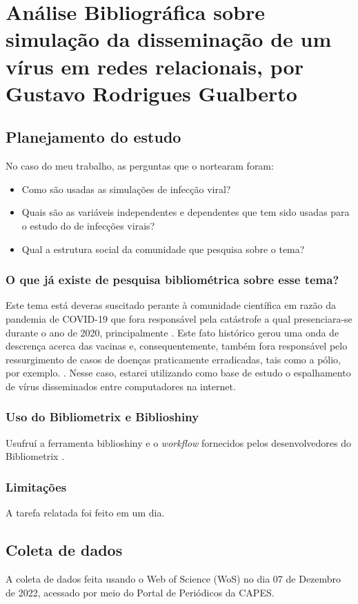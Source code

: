 \chapter{Análise Bibliográfica sobre simulação da disseminação de um vírus em redes relacionais, por Gustavo Rodrigues Gualberto\label{chap:bibliometria:gustavorgygo}}

\section{Planejamento do estudo\label{gustavorgygo:questoes}}

No caso do meu trabalho, as perguntas que o nortearam foram:

\begin{itemize}

    \item Como são usadas as simulações de infecção viral? 
    
    \item Quais são as variáveis independentes e dependentes que tem sido usadas para o estudo do de infecções virais? 
    
    \item Qual a estrutura social da comunidade que pesquisa sobre o tema?
    
\end{itemize}

\subsection{O que já existe de pesquisa bibliométrica sobre esse tema?}

 Este tema está deveras suscitado perante à comunidade científica em razão da pandemia de COVID-19 que fora responsável pela catástrofe a qual presenciara-se durante o ano de 2020, principalmente \citep{maheshwari_network_2020}. Este fato histórico gerou uma onda de descrença acerca das vacinas e, consequentemente, também fora responsável pelo ressurgimento de casos de doenças praticamente erradicadas, tais como a pólio, por exemplo. \citep{mckeever_poliomielite_2022}. Nesse caso, estarei utilizando como base de estudo o espalhamento de vírus disseminados entre computadores na internet.

 \subsection{Uso do Bibliometrix e Biblioshiny}

 Usufruí a ferramenta biblioshiny e o \textit{workflow} fornecidos pelos desenvolvedores do Bibliometrix \cite{aria_bibliometrix_2017}.

\subsection{Limitações} 

A tarefa relatada foi feito em um dia.

\section{Coleta de dados\label{gustavorgygo:coleta}}

A coleta de dados feita usando o Web of Science (WoS) no dia 07 de Dezembro de 2022, acessado por meio do Portal de Periódicos da CAPES.
 

